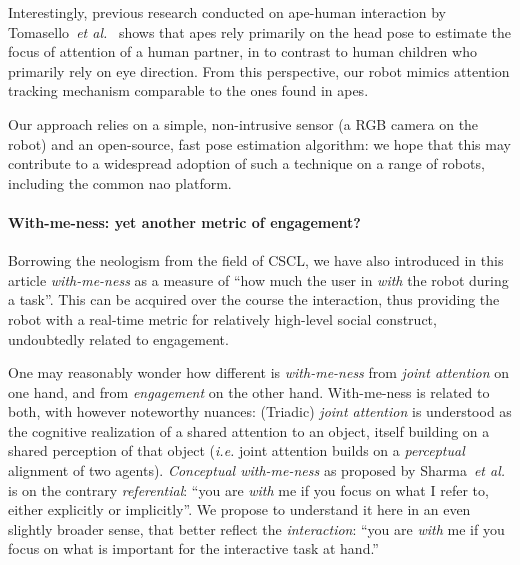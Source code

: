 \documentclass{sig-alternate}
\newcommand{\etal}{\textit{et al.}\xspace}
\newcommand{\ie}{\textit{i.e.}\xspace}
\begin{document}
Interestingly, previous research conducted on ape-human interaction by
Tomasello~\etal~\cite{tomasello2007reliance} shows that apes rely primarily
on the head pose to estimate the focus of attention of a human partner, in to contrast
to human children who primarily rely on eye direction. From this perspective,
our robot mimics attention tracking mechanism comparable to the ones found in apes.

Our approach relies on a simple, non-intrusive sensor (a RGB camera on
the robot) and an open-source, fast pose estimation algorithm: we hope that this may contribute to a widespread
adoption of such a technique on a range of robots, including the common {\sc
nao} platform.


\paragraph{With-me-ness: yet another metric of engagement?}

Borrowing the neologism from the field of CSCL, we have also introduced in this
article
\emph{with-me-ness} as a measure of ``how much the user in \emph{with} the robot during
a task''. This can be acquired over the course the interaction,
thus providing the robot with a real-time metric for relatively high-level social construct,
undoubtedly related to engagement.

One may reasonably wonder how different is \emph{with-me-ness} from \emph{joint
attention} on one hand, and from \emph{engagement} on the other hand.
With-me-ness is related to both, with however noteworthy nuances: (Triadic) \emph{joint
attention} is understood as the cognitive realization of a shared attention to
an object, itself building on a shared perception of that object (\ie joint attention
builds on a \emph{perceptual} alignment of two agents). \emph{Conceptual
with-me-ness} as proposed by Sharma~\etal is on the contrary \emph{referential}: ``you are
\emph{with} me if you focus on what I refer to, either explicitly or
implicitly''. We propose to understand it here in an even slightly broader sense, that
better reflect the \emph{interaction}: ``you are \emph{with} me if you focus on
what is important for the interactive task at hand.''
\end{document}
